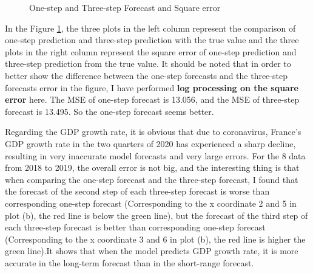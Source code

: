 \documentclass{report}
\begin{document}
\begin{figure}[H]
\caption{One-step and Three-step Forecast and Square error}
\label{Fig.forecast}
\end{figure}

In the Figure \ref{Fig.forecast}, the three plots in the left column represent the comparison of one-step prediction and three-step prediction with the true value and the three plots in the right column represent the square error of one-step prediction and three-step prediction from the true value. It should be noted that in order to better show the difference between the one-step forecasts and the three-step forecasts error in the figure, I have performed \textbf{log processing on the square error} here. The MSE of one-step forecast is 13.056, and the MSE of three-step forecast is 13.495. So the one-step forecast seems better.

Regarding the GDP growth rate, it is obvious that due to coronavirus, France’s GDP growth rate in the two quarters of 2020 has experienced a sharp decline, resulting in very inaccurate model forecasts and very large errors. For the 8 data from 2018 to 2019, the overall error is not big, and the interesting thing is that when comparing the one-step forecast and the three-step forecast, I found that the forecast of the second step of each three-step forecast is worse than corresponding one-step forecast (Corresponding to the x coordinate 2 and 5 in plot (b), the red line is below the green line), but the forecast of the third step of each three-step forecast is better than corresponding one-step forecast (Corresponding to the x coordinate 3 and 6 in plot (b), the red line is higher the green line).It shows that when the model predicts GDP growth rate, it is more accurate in the long-term forecast than in the short-range forecast.
\end{document}

